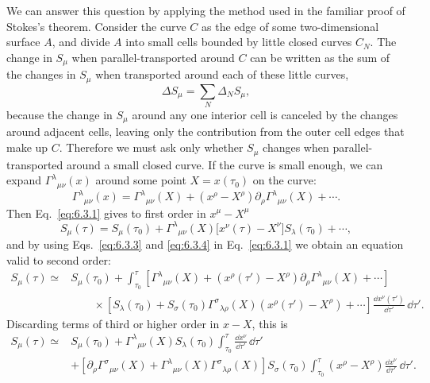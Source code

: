 We can answer this question by applying the method used in the familiar proof
of Stokes's theorem. Consider the curve \(C\) as the edge of some
two-dimensional surface \(A\), and divide \(A\) into small cells bounded by
little closed curves \(C_N\). The change in \(S_\mu\) when
parallel-transported around \(C\) can be written as the sum of the changes in
\(S_\mu\) when transported around each of these little curves,
\begin{equation}
  \Delta S_\mu
  =
  \sum_N\Delta_N S_\mu,
  \tag{6.3.2}\label{eq:6.3.2}
\end{equation}
because the change in \(S_\mu\) around any one interior cell is canceled by
the changes around adjacent cells, leaving only the contribution from the
outer cell edges that make up \(C\). Therefore we must ask only whether
\(S_\mu\) changes when parallel-transported around a small closed curve. If
the curve is small enough, we can expand
\(\Gamma^\lambda{}_{\mu\nu}(x)\) around some point
\(X=x(\tau_0)\) on the curve:
\begin{equation}
  \Gamma^\lambda{}_{\mu\nu}(x)
  =
  \Gamma^\lambda{}_{\mu\nu}(X)
  +(x^\rho-X^\rho)
   \partial_\rho\Gamma^\lambda{}_{\mu\nu}(X)
  +\cdots.
  \tag{6.3.3}\label{eq:6.3.3}
\end{equation}
Then Eq.~\eqref{eq:6.3.1} gives to first order in \(x^\mu-X^\mu\)
\begin{equation}
  S_\mu(\tau)
  =
  S_\mu(\tau_0)
  +\Gamma^\lambda{}_{\mu\nu}(X)
   \bigl[x^\nu(\tau)-X^\nu\bigr]S_\lambda(\tau_0)
  +\cdots,
  \tag{6.3.4}\label{eq:6.3.4}
\end{equation}
and by using Eqs.~\eqref{eq:6.3.3} and \eqref{eq:6.3.4} in
Eq.~\eqref{eq:6.3.1} we obtain an equation valid to second order:
\begin{align*}
  S_\mu(\tau)
  \simeq{}&
  S_\mu(\tau_0)
  +\int_{\tau_0}^{\tau}
  \left[
    \Gamma^\lambda{}_{\mu\nu}(X)
    +(x^\rho(\tau')-X^\rho)
     \partial_\rho\Gamma^\lambda{}_{\mu\nu}(X)
    +\cdots
  \right]
  \\
  &\qquad\times
  \left[
    S_\lambda(\tau_0)
    +S_\sigma(\tau_0)\Gamma^\sigma{}_{\lambda\rho}(X)
     (x^\rho(\tau')-X^\rho)
    +\cdots
  \right]
  \frac{\dd x^\nu(\tau')}{\dd\tau'}\,\dd\tau'.
\end{align*}
Discarding terms of third or higher order in \(x-X\), this is
\begin{align*}
  S_\mu(\tau)
  \simeq{}&
  S_\mu(\tau_0)
  +\Gamma^\lambda{}_{\mu\nu}(X)S_\lambda(\tau_0)
   \int_{\tau_0}^{\tau}
   \frac{\dd x^\nu}{\dd\tau'}\,\dd\tau'
  \\
  &+
  \left[
    \partial_\rho\Gamma^\sigma{}_{\mu\nu}(X)
    +\Gamma^\lambda{}_{\mu\nu}(X)
     \Gamma^\sigma{}_{\lambda\rho}(X)
  \right]S_\sigma(\tau_0)
  \int_{\tau_0}^{\tau}
  (x^\rho-X^\rho)\frac{\dd x^\nu}{\dd\tau'}\,\dd\tau'.
\end{align*}
